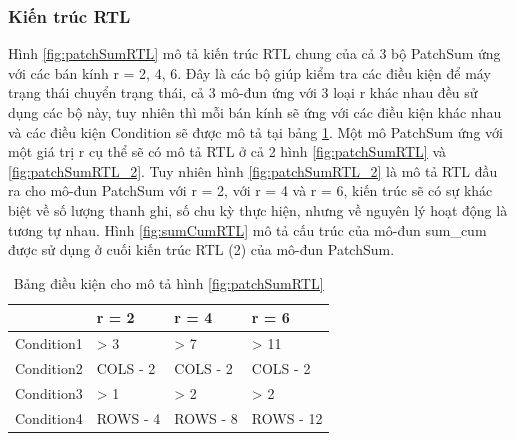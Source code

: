 \subsubsection{Kiến trúc RTL}
Hình \ref{fig:patchSumRTL} mô tả kiến trúc RTL chung của cả 3 bộ PatchSum ứng với các bán kính r = 2, 4, 6. Đây là các bộ giúp kiểm tra các điều kiện để máy trạng thái chuyển trạng thái, cả 3 mô-đun ứng với 3 loại r khác nhau đều sử dụng các bộ này, tuy nhiên thì mỗi bán kính sẽ ứng với các điều kiện khác nhau và các điều kiện Condition sẽ được mô tả tại bảng \ref{tab:conditionRTLPatchSum}. Một mô PatchSum ứng với một giá trị r cụ thể sẽ có mô tả RTL ở cả 2 hình \ref{fig:patchSumRTL} và \ref{fig:patchSumRTL_2}. Tuy nhiên hình \ref{fig:patchSumRTL_2} là mô tả RTL đầu ra cho mô-đun PatchSum với r = 2, với r = 4 và r = 6, kiến trúc sẽ có sự khác biệt về số lượng thanh ghi, số chu kỳ thực hiện, nhưng về nguyên lý hoạt động là tương tự nhau. Hình \ref{fig:sumCumRTL} mô tả cấu trúc của mô-đun sum\_cum được sử dụng ở cuối kiến trúc RTL (2) của mô-đun PatchSum.
\begin{table}[H]
	\centering
		\caption{Bảng điều kiện cho mô tả hình \ref{fig:patchSumRTL}}
	\begin{tabular}{|>{\centering\arraybackslash}m{5cm}|>{\centering\arraybackslash}m{3cm}|>{\centering\arraybackslash}m{3cm}|>{\centering\arraybackslash}m{3cm}|}
		\hline
		\rowcolor{gray!30}
		\diagbox[width=5cm,height=1.5cm,dir=NE]{\textbf{Loại điều kiện}}{\textbf{Bán kính}} & \textbf{r = 2}  & \textbf{r = 4} & \textbf{r = 6} \\
		\hline
		Condition1 & > 3 & > 7 & > 11 \\
		\hline
		Condition2 & COLS - 2 & COLS - 2 & COLS - 2 \\
		\hline
		Condition3 & > 1 & > 2 & > 2 \\
		\hline
		Condition4 & ROWS - 4 & ROWS - 8 & ROWS - 12 \\
		\hline
	\end{tabular}

	\label{tab:conditionRTLPatchSum}
\end{table}

